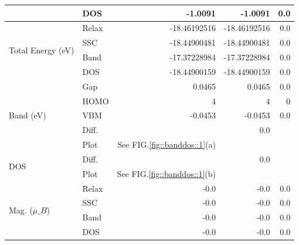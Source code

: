 \documentclass[a4paper, 12pt]{article}
\begin{document}
\begin{table}[H]
\begin{tabular}{l|l||rrr}
                                        & DOS   &    -1.0091 &    -1.0091 &       0.0\\
    \hline
    \multirow{4}{*}{Total Energy (eV)} & Relax & -18.46192516 & -18.46192516 &       0.0\\
                                        & SSC   & -18.44900481 & -18.44900481 &       0.0\\
                                        & Band  & -17.37228984 & -17.37228984 &       0.0\\
                                        & DOS   & -18.44900159 & -18.44900159 &       0.0\\
    \hline
    \multirow{5}{*}{Band (eV)}  & Gap   &     0.0465 &     0.0465 &        0.0\\
                                 & HOMO  &          4 &          4 &          0\\
                                 & VBM   &    -0.0453 &    -0.0453 &        0.0\\
                                 & Diff. & \multicolumn{2}{|r}{       0.0}\\
                                 & Plot  & See FIG.\ref{fig::banddos::1}(a)\\
    \hline
    \multirow{2}{*}{DOS} & Diff. & \multicolumn{2}{|r}{       0.0}\\
                          & Plot  & See FIG.\ref{fig::banddos::1}(b)\\
                          \hline
    \multirow{4}{*}{Mag. (\(\mu\_B\))} & Relax &       -0.0 &       -0.0 &        0.0\\
                                          & SSC   &       -0.0 &       -0.0 &        0.0\\
                                          & Band  &       -0.0 &       -0.0 &        0.0\\
                                          & DOS   &       -0.0 &       -0.0 &        0.0\\
    \hline
    \hline
  \end{tabular}
\end{table}
\end{document}
